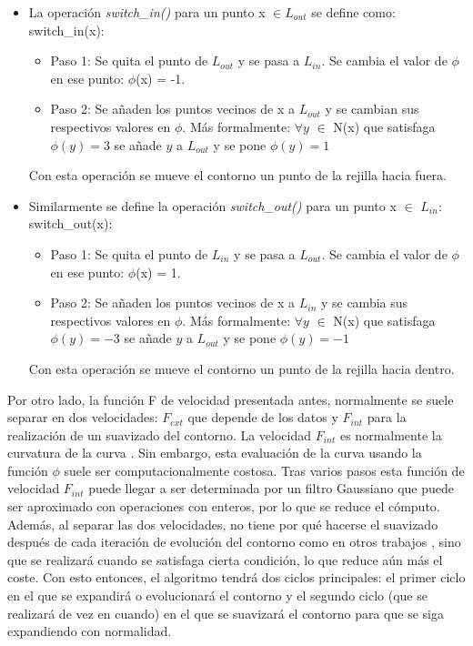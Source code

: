  \begin{itemize}
 	\item  La operaci\'{o}n \textit{switch\_in()} para un punto x $\in L_{out}$ se define como:
 	switch\_in(x):
 	\begin{itemize}
 		\item Paso 1: Se quita el punto de $L_{out}$ y se pasa a $L_{in}$. Se cambia el valor de $\phi$ en ese punto: $\phi$(x) = -1.
 		\item Paso 2: Se a\~{n}aden los puntos vecinos de x a $L_{out}$ y se cambian sus respectivos valores en $\phi$. M\'{a}s formalmente: $\forall y$ $\in$ N(x) que satisfaga $\phi(y) = 3$ se a\~{n}ade $y$ a $L_{out}$ y se pone $\phi(y) = 1$
 	\end{itemize}
 	Con esta operaci\'{o}n se mueve el contorno un punto de la rejilla hacia fuera. 
 	\item Similarmente se define la operaci\'{o}n \textit{switch\_out()} para un punto x $\in$ $L_{in}$:
 	 switch\_out(x): 	 
 	 \begin{itemize}
 	 	\item Paso 1: Se quita el punto de  $L_{in}$ y se pasa a $L_{out}$. Se cambia el valor de $\phi$ en ese punto: $\phi$(x) = 1.
 	 	\item Paso 2: Se a\~{n}aden los puntos vecinos de x a $L_{in}$ y se cambia sus respectivos valores en $\phi$. M\'{a}s formalmente: $\forall y $ $\in$ N(x) que satisfaga $\phi(y) = -3$ se a\~{n}ade $y$ a $L_{out}$ y se pone $\phi(y) = -1$
 	 \end{itemize}
 	Con esta operaci\'{o}n se mueve el contorno un punto de la rejilla hacia dentro. 
 \end{itemize}

Por otro lado, la funci\'{o}n F de velocidad presentada antes, normalmente se suele separar en dos velocidades: $F_{ext}$ que depende de los datos y $F_{int}$ para la realizaci\'{o}n de un suavizado del contorno. La velocidad $F_{int}$ es normalmente la curvatura de la curva \cite{chan}. Sin embargo, esta evaluaci\'{o}n de la curva usando la funci\'{o}n $\phi$ suele ser computacionalmente costosa. Tras varios pasos esta funci\'{o}n de velocidad $F_{int}$ puede llegar a ser determinada por un filtro Gaussiano que puede ser aproximado con operaciones con enteros, por lo que se reduce el c\'{o}mputo. Adem\'{a}s, al separar las dos velocidades, no tiene por qu\'{e} hacerse el suavizado despu\'{e}s de cada iteraci\'{o}n de evoluci\'{o}n del contorno como en otros trabajos \cite{yong1}, sino que se realizar\'{a} cuando se satisfaga cierta condici\'{o}n, lo que reduce a\'{u}n m\'{a}s el coste. Con esto entonces, el algoritmo tendr\'{a} dos ciclos principales: el primer ciclo en el que se expandir\'{a} o evolucionar\'{a} el contorno y el segundo ciclo (que se realizar\'{a} de vez en cuando) en el que se suavizar\'{a} el contorno para que se siga expandiendo con normalidad. 


